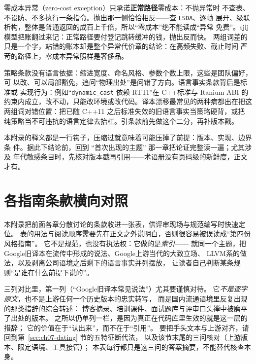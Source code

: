\documentclass[12pt,a4paper,fontset=fandol]{ctexbook}
\newcommand{\cpp}[1]{C++#1}
\newcommand{\Tp}[1]{\texttt{#1}}
\newcommand{\Bk}{\discretionary{}{}{}}
\newcommand{\Lang}[1]{\textsf{#1}}
\newcommand{\CPP}{\Lang{C++}}
\newcommand{\DomGo}{\Lang{Google}}
\newcommand{\DomLlvm}{\Lang{LLVM}}
\begin{document}
\begin{compare}[title={零成本异常 vs 异常路径零成本}]
零成本异常（zero-cost exception）只承诺\textbf{正常路径}零成本：不抛异常时
不查表、不设防、不多执行一条指令。抛出那一侧恰恰相反——查 \Tp{LSDA}、逐帧
展开、级联析构，整体是普通返回的成百上千倍，所以``零成本''绝不能读成``异常
免费''。sjlj 模型把账翻过来记：正常路径要付登记跳转缓冲的钱，抛出反而快。
两组词差的只是一个字，站错的账本却是整个异常代价章的结论：在高频失败、截止时间
严苛的路径上，零成本异常照样是奢侈品。
\end{compare}

\begin{compare}[title={策略条款 vs 语言事实条款}]
策略条款没有语言依据：缩进宽度、命名风格、参数个数上限，这些是团队偏好，可
以改、可以局部豁免，追问``物理出处''是问错了方向。语言事实条款背后是标准或
实现行为：例如``\Tp{dynamic{\Bk}\_cast} 依赖 RTTI''在 \CPP 标准与 Itanium ABI
的约束内成立，改不动，只能改环境或改代码。译本漂移最常见的两种病都出在把这
两组词对错位置：把已随 \cpp{11} 之后标准失效的旧语言事实当策略硬背，或把
纯策略当不可违抗的语言定律去抬杠。引条款前先做这个二分，再补版本戳。
\end{compare}

\begin{warning}[title={术语册不能替代论证}]
本附录的释义都是一行钩子，压缩过就意味着可能压掉了前提：版本、实现、边界条
件。据此下结论前，回到 ``首次出现的主题'' 那一章把论证完整读一遍；尤其涉及
年代敏感条目时，先核对版本戳再引用——术语册没有页码级的新鲜度，正文才有。
\end{warning}


\chapter{各指南条款横向对照}
\label{apx:matrix}

本附录把前面各章分散讨论的条款收进一张表，供评审现场与规范编写时快速定位。
表的用法与阅读顺序需要先在正文之外说明白，否则很容易被误读成``第四份风格指南''。
它不是规范，也没有执法权：它做的是\emph{索引}——
就同一个主题，把\DomGo 旧译本在流传中形成的说法、\DomGo 上游当代的大致立场、
\DomLlvm 系的做法，以及剥离公司语境之后剩下的语言事实并列摆放，
让读者自己判断某条规则``是谁在什么前提下说的''。

三列对比里，第一列（``\DomGo 旧译本常见说法''）尤其要谨慎对待。
它\emph{不是逐字原文}，也不是上游任何一个历史版本的忠实转写，
而是国内流通语境里反复出现的那类措辞的综合转述：
博客摘录、培训课件、面试题库与评审口头禅中被磨平了出处的版本。
之所以仍单列一栏，是因为真正在代码库里生效的就是这一层的措辞；
它的价值在于``认出来''，而不在于``引用''。
要把手头文本与上游对齐，请回到第~\ref{sec:ch07-dating} 节的五特征断代法，
以及该节末尾的三问核对（上游版本、限定语境、工具接管）；
本表每行都只是这三问的答案摘要，不能替代核查本身。
\end{document}
